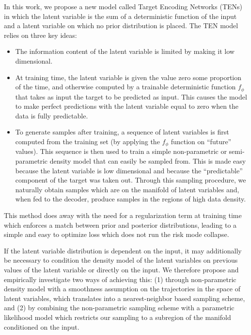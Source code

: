\documentclass{article}
\begin{document}
In this work, we propose a new model called Target Encoding Networks (TENs) in which the latent variable is the sum of a deterministic function of the input and a latent variable on which no prior distribution is placed.
The TEN model relies on three key ideas:
%
\begin{itemize}
  \item
    The information content of the latent variable is limited by making it low dimensional.
  \item
    At training time, the latent variable is given the value zero some proportion of the time, and otherwise computed by a trainable deterministic function $f_\phi$ that takes as input the target to be predicted as input.
  This causes the model to make perfect predictions with the latent variable equal to zero when the data is fully predictable.
  \item
    To generate samples after training, a sequence of latent variables is first computed from the training set (by applying the $f_\phi$ function on ``future'' values).
    This sequence is then used to train a simple non-parametric or semi-parametric density model that can easily be sampled from.
    This is made easy because the latent variable is low dimensional and because the ``predictable'' component of the target was taken out.
    Through this sampling procedure, we naturally obtain samples which are on the manifold of latent variables and, when fed to the decoder, produce samples in the regions of high data density.
\end{itemize}

This method does away with the need for a regularization term at training time which enforces a match between prior and posterior distributions, leading to a simple and easy to optimize loss which does not run the risk mode collapse.

If the latent variable distribution is dependent on the input, it may additionally be necessary to condition the density model of the latent variables on previous values of the latent variable or directly on the input. We therefore propose and empirically investigate two ways of achieving this: (1) through non-parametric density model with a smoothness assumption on the trajectories in the space of latent variables, which translates into a nearest-neighbor based sampling scheme, and (2) by combining the non-parametric sampling scheme with a parametric likelihood model which restricts our sampling to a subregion of the manifold conditioned on the input.
\end{document}

